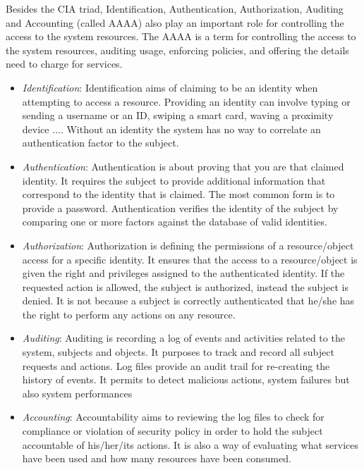Besides the CIA triad, Identification, Authentication, Authorization, Auditing and Accounting (called AAAA) also play an important role for controlling the access to the system resources. The AAAA is a term for controlling the access to the system resources, auditing usage, enforcing policies, and offering the details need to charge for services.
\begin{itemize}
    \setlength\itemsep{1em}
    \item \emph{Identification}: Identification aims of claiming to be an identity when attempting to access a resource. Providing an identity can involve typing or sending a username or an ID, swiping a smart card, waving a proximity device $\ldots$. Without an identity the system has no way to correlate an authentication factor to the subject. 
    \item \emph{Authentication}: Authentication is about proving that you are that claimed identity. It requires the subject to provide additional information that correspond to the identity that is claimed. The most common form is to provide a password. Authentication verifies the identity of the subject by comparing one or more factors against the database of valid identities.
    \item \emph{Authorization}: Authorization is defining the permissions of a resource/object access for a specific identity. It ensures that the access to a resource/object is given the right and privileges assigned to the authenticated identity. If the requested action is allowed, the subject is authorized, instead the subject is denied. It is not because a subject is correctly authenticated that he/she has the right to perform any actions on any resource.
    \item \emph{Auditing}: Auditing is recording a log of events and activities related to the system, subjects and objects. It purposes to track and record all subject requests and actions. Log files provide an audit trail for re-creating the history of events. It permits to detect malicious actions, system failures but also system performances
    \item \emph{Accounting}: Accountability aims to reviewing the log files to check for compliance or violation of security policy in order to hold the subject accountable of his/her/its actions. It is also a way of evaluating what services have been used and how many resources have been consumed.
\end{itemize}



